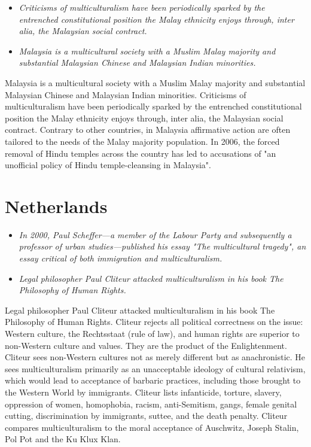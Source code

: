 \begin{itemize}
\item
  \emph{Criticisms of multiculturalism have been periodically sparked by
  the entrenched constitutional position the Malay ethnicity enjoys
  through, inter alia, the Malaysian social contract.}
\item
  \emph{Malaysia is a multicultural society with a Muslim Malay majority
  and substantial Malaysian Chinese and Malaysian Indian minorities.}
\end{itemize}

Malaysia is a multicultural society with a Muslim Malay majority and
substantial Malaysian Chinese and Malaysian Indian minorities.
Criticisms of multiculturalism have been periodically sparked by the
entrenched constitutional position the Malay ethnicity enjoys through,
inter alia, the Malaysian social contract. Contrary to other countries,
in Malaysia affirmative action are often tailored to the needs of the
Malay majority population. In 2006, the forced removal of Hindu temples
across the country has led to accusations of "an unofficial policy of
Hindu temple-cleansing in Malaysia".

\section{Netherlands}\label{netherlands}

\begin{itemize}
\item
  \emph{In 2000, Paul Scheffer---a member of the Labour Party and
  subsequently a professor of urban studies---published his essay "The
  multicultural tragedy", an essay critical of both immigration and
  multiculturalism.}
\item
  \emph{Legal philosopher Paul Cliteur attacked multiculturalism in his
  book The Philosophy of Human Rights.}
\end{itemize}

Legal philosopher Paul Cliteur attacked multiculturalism in his book The
Philosophy of Human Rights. Cliteur rejects all political correctness on
the issue: Western culture, the Rechtsstaat (rule of law), and human
rights are superior to non-Western culture and values. They are the
product of the Enlightenment. Cliteur sees non-Western cultures not as
merely different but as anachronistic. He sees multiculturalism
primarily as an unacceptable ideology of cultural relativism, which
would lead to acceptance of barbaric practices, including those brought
to the Western World by immigrants. Cliteur lists infanticide, torture,
slavery, oppression of women, homophobia, racism, anti-Semitism, gangs,
female genital cutting, discrimination by immigrants, suttee, and the
death penalty. Cliteur compares multiculturalism to the moral acceptance
of Auschwitz, Joseph Stalin, Pol Pot and the Ku Klux Klan.


